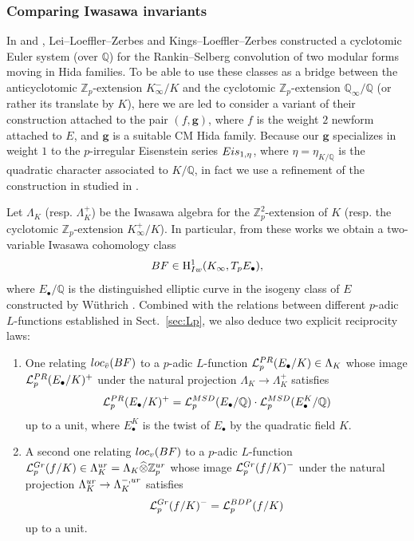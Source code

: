 \documentclass[a4paper,10pt]{amsart}
\numberwithin{equation}{section}
\numberwithin{equation}{section}
\theoremstyle{plain}
\theoremstyle{definition}
\theoremstyle{definition}
\theoremstyle{plain}
\theoremstyle{plain}
\theoremstyle{plain}
\theoremstyle{plain}
\newcommand{\Z}{\mathbb{Z}}
\newcommand{\Q}{\mathbb{Q}}
\newcommand{\Lcal}{\mathcal{L}}
\newcommand{\rH}{\mathrm{H}}
\begin{document}
\subsubsection*{Comparing Iwasawa invariants}


In \cite{RSCMF} and \cite{explicit}, 
Lei--Loeffler--Zerbes and Kings--Loeffler--Zerbes constructed a cyclotomic Euler system %
(over $\Q$) for the Rankin--Selberg convolution of two modular forms moving in Hida families. To be able to use these classes as a bridge between the anticyclotomic $\Z_p$-extension $K_\infty^-/K$ and the cyclotomic $\Z_p$-extension $\Q_\infty/\Q$ (or rather its translate by $K$),  %
here we are led to consider a variant of their construction attached to the pair $(f,\boldsymbol{g})$, where $f$ %
is the weight $2$ newform attached to $E$, and $\boldsymbol{g}$ is a suitable CM Hida family. Because our $\boldsymbol{g}$ specializes in weight $1$ to the $p$-irregular Eisenstein series ${\rm Eis}_{1,\eta}$, 
where $\eta=\eta_{K/\Q}$ is the quadratic character associated to $K/\Q$, in fact we use a refinement of the construction in \cite{explicit} studied in \cite{BST}.

Let $\Lambda_K$ (resp. $\Lambda_K^+$) be the Iwasawa algebra for the $\Z_p^2$-extension of $K$ (resp. the cyclotomic $\Z_p$-extension $K_\infty^+/K$). In particular, from these works we obtain a two-variable Iwasawa cohomology class 
\[
BF\in\rH^1_{\rm Iw}(K_\infty,T_pE_\bullet),
\]
where $E_\bullet/\Q$ is the distinguished elliptic curve in the isogeny class of $E$ constructed by W\"uthrich \cite{wuthrich-int}. Combined with the  relations between different $p$-adic $L$-functions established in Sect.~\ref{sec:Lp}, we also deduce two explicit reciprocity laws:
\begin{enumerate}
\item One relating ${\rm loc}_{\bar{v}}(BF)$ to a $p$-adic $L$-function $\Lcal_p^{\rm PR}(E_\bullet/K)\in\Lambda_K$ whose image $\Lcal_p^{\rm PR}(E_\bullet/K)^+$ under the natural projection $\Lambda_K\rightarrow\Lambda_K^+$ satisfies
\[
\Lcal_p^{\rm PR}(E_\bullet/K)^+=\Lcal_p^{\rm MSD}(E_\bullet/\Q)\cdot\Lcal_p^{\rm MSD}(E_\bullet^K/\Q)
\]
up to a unit, where $E_\bullet^K$ is the twist of $E_\bullet$ by the quadratic field $K$.
\item A second one relating ${\rm loc}_v(BF)$ to a $p$-adic $L$-function $\Lcal_p^{\rm Gr}(f/K)\in\Lambda_K^{\rm ur}=\Lambda_K\widehat\otimes\Z_p^{\rm ur}$ whose image $\Lcal_p^{\rm Gr}(f/K)^-$ under the natural projection $\Lambda_K^{\rm ur}\rightarrow\Lambda_K^{-,\rm ur}$ satisfies
\[
\Lcal_p^{\rm Gr}(f/K)^-=\Lcal_p^{\rm BDP}(f/K)
\]
up to a unit. 
\end{enumerate}
\end{document}
